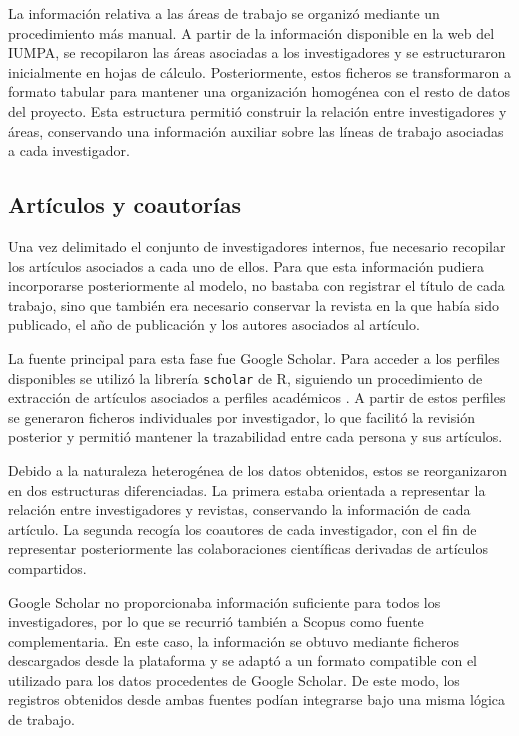 \documentclass[11pt,spanish,listoffigures,listoftables]{tfgetsinf}
\begin{document}
La información relativa a las áreas de trabajo se organizó mediante un procedimiento más manual. A partir de la información disponible en la web del IUMPA, se recopilaron las áreas asociadas a los investigadores y se estructuraron inicialmente en hojas de cálculo. Posteriormente, estos ficheros se transformaron a formato tabular para mantener una organización homogénea con el resto de datos del proyecto. Esta estructura permitió construir la relación entre investigadores y áreas, conservando una información auxiliar sobre las líneas de trabajo asociadas a cada investigador.

\subsection{Artículos y coautorías}

Una vez delimitado el conjunto de investigadores internos, fue necesario recopilar los artículos asociados a cada uno de ellos. Para que esta información pudiera incorporarse posteriormente al modelo, no bastaba con registrar el título de cada trabajo, sino que también era necesario conservar la revista en la que había sido publicado, el año de publicación y los autores asociados al artículo.

La fuente principal para esta fase fue Google Scholar. Para acceder a los perfiles disponibles se utilizó la librería \texttt{scholar} de R, siguiendo un procedimiento de extracción de artículos asociados a perfiles académicos \cite{r_scholar,beugnon_scholar}. A partir de estos perfiles se generaron ficheros individuales por investigador, lo que facilitó la revisión posterior y permitió mantener la trazabilidad entre cada persona y sus artículos.

Debido a la naturaleza heterogénea de los datos obtenidos, estos se reorganizaron en dos estructuras diferenciadas. La primera estaba orientada a representar la relación entre investigadores y revistas, conservando la información de cada artículo. La segunda recogía los coautores de cada investigador, con el fin de representar posteriormente las colaboraciones científicas derivadas de artículos compartidos.

Google Scholar no proporcionaba información suficiente para todos los investigadores, por lo que se recurrió también a Scopus como fuente complementaria. En este caso, la información se obtuvo mediante ficheros descargados desde la plataforma y se adaptó a un formato compatible con el utilizado para los datos procedentes de Google Scholar. De este modo, los registros obtenidos desde ambas fuentes podían integrarse bajo una misma lógica de trabajo.
\end{document}
